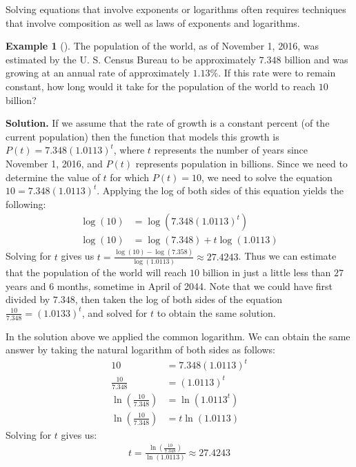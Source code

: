 \documentclass[10pt,]{book}
\theoremstyle{plain}
\theoremstyle{definition}
\theoremstyle{definition}
\newtheorem{example}[theorem]{Example}
\theoremstyle{definition}
\numberwithin{equation}{section}
\newcommand{\amp}{&}
\begin{document}
\hypertarget{p-372}{}%
Solving equations that involve exponents or logarithms often requires techniques that involve composition as well as laws of exponents and logarithms.%
\begin{example}[]\label{example-30}
\hypertarget{p-373}{}%
The population of the world, as of November 1, 2016, was estimated by the U. S. Census Bureau to be approximately \(7.348\) billion and was growing at an annual rate of approximately \(1.13\%\). If this rate were to remain constant, how long would it take for the population of the world to reach \(10\) billion?%
\par\smallskip%
\noindent\textbf{Solution.}\hypertarget{solution-30}{}\quad%
\hypertarget{p-374}{}%
If we assume that the rate of growth is a constant percent (of the current population) then the function that models this growth is \(P(t)=7.348 \left( 1.0113 \right)^t\), where \(t\) represents the number of years since November 1, 2016, and \(P(t)\) represents population in billions.  Since we need to determine the value of \(t\) for which \(P(t) = 10\), we need to solve the equation \(10 = 7.348 \left( 1.0113 \right)^t\). Applying the log of both sides of this equation yields the following:%
\begin{align*}
\log \left( 10 \right) \amp = \log \left( 7.348 (1.0113)^t \right)\\
\log \left( 10 \right) \amp = \log \left( 7.348 \right) + t \log \left( 1.0113 \right)
\end{align*}
Solving for \(t\) gives us \(t = \frac{\log \left( 10 \right) - \log \left( 7.358 \right)}{\log \left( 1.0113 \right)} \approx 27.4243\). Thus we can estimate that the population of the world will reach \(10\) billion in just a little less than \(27\) years and \(6\) months, sometime in April of 2044. Note that we could have first divided by \(7.348\), then taken the log of both sides of the equation \(\frac{10}{7.348} = \left( 1.0133 \right) ^t\), and solved for \(t\) to obtain the same solution.%
\par
\hypertarget{p-375}{}%
In the solution above we applied the common logarithm. We can obtain the same answer by taking the natural logarithm of both sides as follows:%
\begin{align*}
10 \amp = 7.348 \left( 1.0113 \right) ^t\\
\frac{10}{7.348} \amp = \left( 1.0113 \right) ^t\\
\ln \left( \frac{10}{7.348} \right) \amp = \ln \left( 1.0113^t \right)\\
\ln \left( \frac{10}{7.348} \right) \amp = t \ln \left( 1.0113 \right)
\end{align*}
Solving for \(t\) gives us:%
\begin{gather*}
t = \frac{\ln \left( \frac{10}{7.348} \right)}{\ln \left( 1.0113 \right)} \approx 27.4243
\end{gather*}
%
\end{example}
\end{document}
